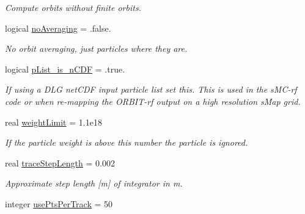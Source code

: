 \begin{CompactItemize}
\begin{CompactList}\small\item\em Compute orbits without finite orbits. \item\end{CompactList}\item 
\hypertarget{namespaceread__namelist_492e6bd5717c893cd13d8f26583fb26b}{
logical \hyperlink{namespaceread__namelist_492e6bd5717c893cd13d8f26583fb26b}{noAveraging} = .false.}
\label{namespaceread__namelist_492e6bd5717c893cd13d8f26583fb26b}

\begin{CompactList}\small\item\em No orbit averaging, just particles where they are. \item\end{CompactList}\item 
\hypertarget{namespaceread__namelist_748175de2b43e11e3386c204cd04fb58}{
logical \hyperlink{namespaceread__namelist_748175de2b43e11e3386c204cd04fb58}{pList\_\-is\_\-nCDF} = .true.}
\label{namespaceread__namelist_748175de2b43e11e3386c204cd04fb58}

\begin{CompactList}\small\item\em If using a DLG netCDF input particle list set this. This is used in the sMC-rf code or when re-mapping the ORBIT-rf output on a high resolution sMap grid. \item\end{CompactList}\item 
\hypertarget{namespaceread__namelist_bf828558912f2f900d4ed8a0498e776a}{
real \hyperlink{namespaceread__namelist_bf828558912f2f900d4ed8a0498e776a}{weightLimit} = 1.1e18}
\label{namespaceread__namelist_bf828558912f2f900d4ed8a0498e776a}

\begin{CompactList}\small\item\em If the particle weight is above this number the particle is ignored. \item\end{CompactList}\item 
\hypertarget{namespaceread__namelist_cc063dbf0644b646f454f3a426c4176e}{
real \hyperlink{namespaceread__namelist_cc063dbf0644b646f454f3a426c4176e}{traceStepLength} = 0.002}
\label{namespaceread__namelist_cc063dbf0644b646f454f3a426c4176e}

\begin{CompactList}\small\item\em Approximate step length \mbox{[}m\mbox{]} of integrator in m. \item\end{CompactList}\item 
\hypertarget{namespaceread__namelist_6a4ce56f8146141d9f0d1a1a019b7edb}{
integer \hyperlink{namespaceread__namelist_6a4ce56f8146141d9f0d1a1a019b7edb}{usePtsPerTrack} = 50}
\label{namespaceread__namelist_6a4ce56f8146141d9f0d1a1a019b7edb}


\end{CompactItemize}
